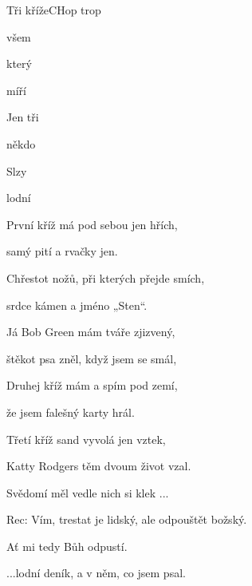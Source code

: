 \begin{song}{Tři kříže}{C}{Hop trop}

\begin{SBVerse}

všem 

který 


míří 

\end{SBVerse}

\begin{SBChorus}

Jen tři 

někdo 

Slzy 

lodní 

\end{SBChorus}

\begin{SBVerse}

První kříž má pod sebou jen hřích, 

samý pití a rvačky jen.

Chřestot nožů, při kterých přejde smích, 

srdce kámen a jméno „Sten“.

\end{SBVerse}

\begin{SBVerse}

Já Bob Green mám tváře zjizvený, 

štěkot psa zněl, když jsem se smál,

Druhej kříž mám a spím pod zemí, 

že jsem falešný karty hrál.

\end{SBVerse}

\begin{SBVerse}

Třetí kříž sand vyvolá jen vztek, 

Katty Rodgers těm dvoum život vzal.

Svědomí měl vedle nich si klek ...

\end{SBVerse}
\begin{SBChorus*}
Rec: Vím, trestat je lidský, ale odpouštět božský. 

Ať mi tedy Bůh odpustí.
\end{SBChorus*}
\begin{SBChorus}

...lodní deník, a v něm, co jsem psal.

\end{SBChorus}
\end{song}

\pagebreak
